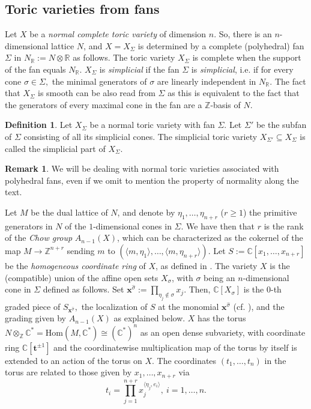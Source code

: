 \documentclass[a4paper,11pt]{amsart}
\newcommand{\C}{\mathbb{C}}
\newcommand{\R}{\mathbb{R}}
\newcommand{\Z}{\mathbb{Z}}
\newcommand{\bft}{{\boldsymbol{t}}}
\newcommand{\bfx}{{\boldsymbol{x}}}
\newcounter{thm}
\numberwithin{thm}{section}
\numberwithin{equation}{section}
\theoremstyle{definition}
\newtheorem{definition}[thm]{Definition}
\newtheorem{remark}[thm]{Remark}
\theoremstyle{plain}
\begin{document}
\subsection{Toric varieties from fans}\label{ssec:tff}
Let $X$ be a {\em normal complete  toric variety} of dimension $n$. So, there is an $n$-dimensional lattice $N$, and $X = X_\Sigma$ is determined by a complete (polyhedral) fan $\Sigma$  in $N_\R:=N\otimes\R$ as follows.
 The toric variety $X_\Sigma$ is complete when the support of the fan equals $N_\R$. $X_\Sigma$ is {\em simplicial} if the fan $\Sigma$ is {\em simplicial}, i.e. if  for every cone $\sigma\in\Sigma,$ the minimal generators of $\sigma$ are linearly independent in $N_\R$.  The fact that $X_\Sigma$ is smooth can be also read from $\Sigma$ as this is equivalent to the fact that the generators of every maximal cone in the fan are a $\Z$-basis of $N$. 
 

\begin{definition} \label{def:simplicial}
Let $X_\Sigma$ be a normal toric variety with fan $\Sigma$. Let ${\Sigma}'$ be the subfan of $\Sigma$ consisting of all its simplicial cones. The simplicial toric variety $X_{{\Sigma}'} \subseteq X_\Sigma$ is called the simplicial part of $X_\Sigma$.
\end{definition}
 
 \begin{remark} \label{rem:normal} We will be dealing with normal toric varieties associated with polyhedral fans, even if we omit to mention the property of normality along the text.
 \end{remark}

Let $M$ be the dual lattice of $N$, and denote by $\eta_1,\ldots, \eta_{n+r}$ ($r\geq1$) the primitive generators in $N$ of the $1$-dimensional cones in $\Sigma$. We have then that  $r$ is the rank of the {\em Chow group} $A_{n-1}(X)$, which can be characterized as the cokernel of the map 
$M\to \Z^{n+r}$ sending $m$ to $(\langle m,\eta_1\rangle ,\ldots, \langle m,\eta_{n+r}\rangle)$.
Let $S:=\C[x_1,\ldots, x_{n+r}]$ be the {\em homogeneous coordinate ring} of $X$, as defined in \cite{cox95}. The variety $X$ is  the (compatible) union of the affine open sets $X_\sigma$, with $\sigma$ being an $n$-dimensional cone in $\Sigma$ defined as follows. Set $\bfx^{\widehat{\sigma}}:=\prod_{\eta_j\notin\sigma} x_j.$  Then, $\C[X_\sigma]$ is the $0$-th graded piece of $S_{\bfx^{\widehat{\sigma}}},$ the localization of $S$ at the monomial $\bfx^{\widehat{\sigma}}$ (cf. \cite[Lemma 2.2]{cox95}), and the grading given by $A_{n-1}(X)$ as explained below. $X$ has  the torus $N\otimes_\Z\C^*=\mbox{Hom}(M,\C^*) \cong (\C^*)^n$ as an open dense subvariety, with coordinate ring $\C[\bft^{\pm1}]$ and the coordinatewise multiplication map of the torus by itself is extended to an action of the torus on $X$.  The coordinates $(t_1, \dots, t_n)$ in the torus are related to those given by $x_1,\ldots, x_{n+r}$ via 
\begin{equation}\label{tx}
t_i=\prod_{j=1}^{n+r} x_j^{\langle\eta_j,e_i\rangle}, \ i=1,\ldots, n.
\end{equation}
\end{document}

